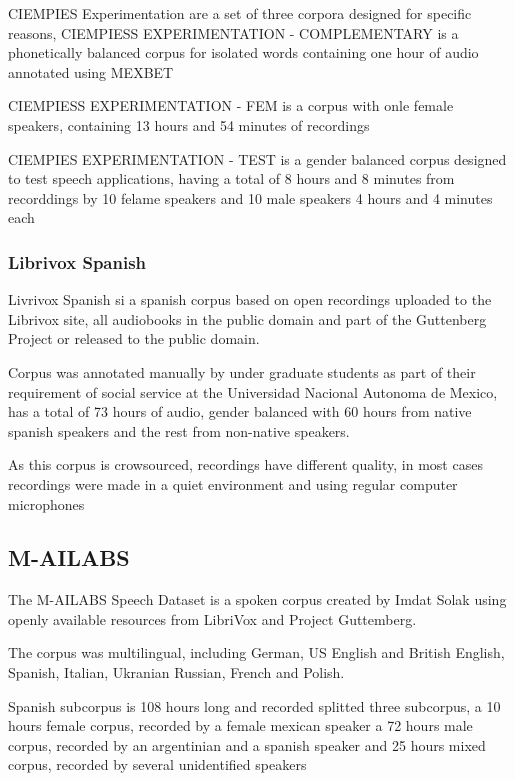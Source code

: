 \documentclass[10pt, a4paper]{article}
\begin{document}
CIEMPIES Experimentation are a set of three corpora designed for specific reasons, CIEMPIESS EXPERIMENTATION - COMPLEMENTARY is a phonetically balanced corpus for isolated words containing one hour of audio annotated using MEXBET

CIEMPIESS EXPERIMENTATION - FEM is a corpus with onle female speakers, containing 13 hours and 54 minutes of recordings

CIEMPIES EXPERIMENTATION - TEST is a gender balanced corpus designed to test speech applications, having a total of 8 hours and 8 minutes from recorddings by 10 felame speakers and 10 male speakers 4 hours and 4 minutes each

\subsubsection{Librivox Spanish}

Livrivox Spanish si a spanish corpus based on open recordings uploaded to the Librivox site, all audiobooks in the public domain and part of the Guttenberg Project or released to the public domain.

Corpus was annotated manually by under graduate students as part of their requirement of social service at the Universidad Nacional Autonoma de Mexico, has a total of 73 hours of audio, gender balanced with 60 hours from native spanish speakers
and the rest from non-native speakers.

As this corpus is crowsourced, recordings have different quality, in most cases recordings were made in a quiet environment and using regular computer microphones


\subsection{M-AILABS}

The M-AILABS Speech Dataset is a spoken corpus created by Imdat Solak using openly available resources from LibriVox and Project Guttemberg.

The corpus was multilingual, including German, US English and British English, Spanish, Italian, Ukranian Russian, French and Polish.

Spanish subcorpus is 108 hours long and recorded splitted three subcorpus, a 10 hours female corpus, recorded by a female mexican speaker a 72 hours male corpus, recorded by an argentinian and a spanish speaker and  25 hours mixed corpus, recorded by several unidentified speakers
\end{document}
